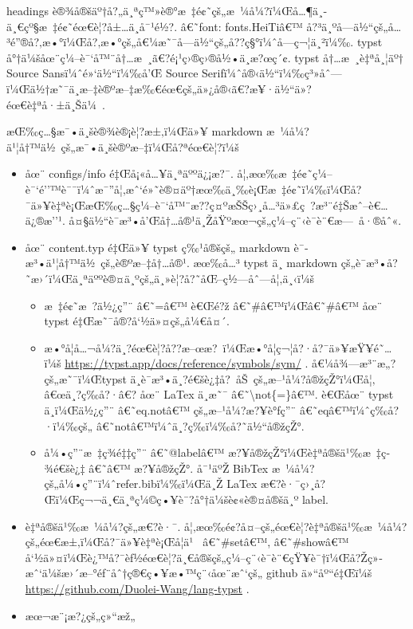 headings
è®¾å®šäº†å?„ä¸ªç™»è®°æ~‡é¢˜çš„æ~¼å¼?ï¼Œå\ldots¶ä¸­ä¸€çº§æ~‡é¢˜éœ€è¦?å±\ldots ä¸­å¯¹é½?.
â€˜font: fonts.HeiTiâ€™
å?³ä¸ºå­---ä½``çš„å\ldots³é''®å?‚æ•°ï¼Œå?‚æ•°çš„å€¼æ˜¯å­---ä½``çš„å??ç§°ï¼ˆå­---ç¬¦ä¸²ï¼‰.
typst å°†ä¼šåœ¨ç¼--è¯`å™¨å†\ldots æ~¸ã€?é¡¹ç›®ç›®å½•ä¸­æ?œç´¢. typst
å†\ldots æ~¸è‡ªå¸¦äº† Source Sansï¼ˆé»`ä½``ï¼‰å'Œ Source
Serifï¼ˆå®‹ä½``ï¼‰ç³»åˆ---ï¼Œä½†æ˜¯ä¸­æ--‡è®ºæ--‡æ‰€éœ€çš„ä»¿å®‹ã€?æ¥·ä½``ä»?éœ€è‡ªå·±ä¸Šä¼~.

æŒ‰ç\ldots§æ¯•ä¸šè®¾è®¡è¦?æ±‚ï¼Œä»¥ markdown
æ~¼å¼?ä¹¦å†™ä½~çš„æ¯•ä¸šè®ºæ--‡ï¼Œå?ªéœ€è¦?ï¼š

\begin{itemize}
\item
  åœ¨ configs/info é‡Œå¡«å\ldots¥ä¸ªäººä¿¡æ?¯.
  å¦‚æœ‰æ~‡é¢˜ç¼--è¯`é''™è¯¯ï¼ˆæ¯''å¦‚æˆ`é»˜è®¤äº†æœ‰ä¸‰è¡Œæ~‡é¢˜ï¼‰ï¼Œå?¯ä»¥è‡ªè¡ŒæŒ‰ç\ldots§ç¼--è¯`å™¨æ??ç¤ºæŠŠç›¸å\ldots³ä»£ç~?æ³¨é‡Šæˆ--è€\ldots ä¿®æ''¹.
  å¤§ä½``è¯­æ³•å'Œå†\ldots å®¹ä¸ŽåŸºæœ¬çš„ç¼--ç¨‹è¯­è¨€æ---~å·®åˆ«.
\item
  åœ¨ content.typ é‡Œä»¥ typst ç‰¹å®šçš„ markdown
  è¯­æ³•ä¹¦å†™ä½~çš„è®ºæ--‡å†\ldots å®¹. æœ‰å\ldots³ typst ä¸­ markdown
  çš„è¯­æ³•å?˜æ›´ï¼Œä¸ªäººè®¤ä¸ºçš„ä¸»è¦?å?˜åŒ--ç½---åˆ---å¦‚ä¸‹ï¼š

  \begin{itemize}
  \tightlist
  \item
    æ~‡é¢˜æ~?ä½¿ç''¨ â€˜=â€™ è€Œé?ž â€˜\#â€™ï¼Œâ€˜\#â€™ åœ¨ typst
    é‡Œæ˜¯å®?å`½ä»¤çš„å¼€å¤´.
  \item
    æ•°å­¦å\ldots¬å¼?ä¸?éœ€è¦?å??æ--œæ?~ï¼Œæ•°å­¦ç¬¦å?·å?¯ä»¥æŸ¥é˜\ldots ï¼š
    \url{https://typst.app/docs/reference/symbols/sym/} .
    å€¼å¾---æ³¨æ„?çš„æ˜¯ï¼Œtypst
    ä¸­è¯­æ³•ä¸?é€šè¿‡å?~åŠ~çš„æ--¹å¼?å®žçŽ°ï¼Œå¦‚ â€œä¸?ç­‰å?·â€? åœ¨
    LaTex ä¸­æ˜¯ â€˜\textbackslash not\{=\}â€™. è€Œåœ¨ typst ä¸­ï¼Œä½¿ç''¨
    â€˜eq.notâ€™ çš„æ--¹å¼?æ?¥è°ƒç''¨ â€˜eqâ€™ï¼ˆç­‰å?·ï¼‰çš„
    â€˜notâ€™ï¼ˆä¸?ç­‰ï¼‰å?˜ä½``å®žçŽ°.
  \item
    å¼•ç''¨æ~‡ç­¾é‡‡ç''¨ â€˜@labelâ€™ æ?¥å®žçŽ°ï¼Œè‡ªå®šä¹‰æ~‡ç­¾é€šè¿‡
    â€˜â€™ æ?¥å®žçŽ°. å¯¹äºŽ BibTex
    æ~¼å¼?çš„å¼•ç''¨ï¼ˆrefer.bibï¼‰ï¼Œä¸Ž LaTex
    æ€?è·¯ç›¸å?Œï¼Œç¬¬ä¸€ä¸ªç¼©ç•¥è¯?å°†ä¼šè¢«è®¤å®šä¸º label.
  \end{itemize}
\item
  è‡ªå®šä¹‰æ~¼å¼?çš„æ€?è·¯.
  å¦‚æœ‰é¢?å¤--çš„éœ€è¦?è‡ªå®šä¹‰æ~¼å¼?çš„éœ€æ±‚ï¼Œå?¯ä»¥è‡ªè¡Œå­¦ä¹~
  â€˜\#setâ€™, â€˜\#showâ€™
  å`½ä»¤ï¼Œè¿™å?¯èƒ½éœ€è¦?ä¸€å®šçš„ç¼--ç¨‹è¯­è¨€çŸ¥è¯†ï¼Œå?Žç»­æˆ`ä¼šæ›´æ--°éƒ¨åˆ†ç®€ç•¥æ•™ç¨‹åœ¨æˆ`çš„
  github ä»``åº``é‡Œï¼š \url{https://github.com/Duolei-Wang/lang-typst}
  .
\item
  æœ¬æ¨¡æ?¿çš„ç»``æž„


\end{itemize}
